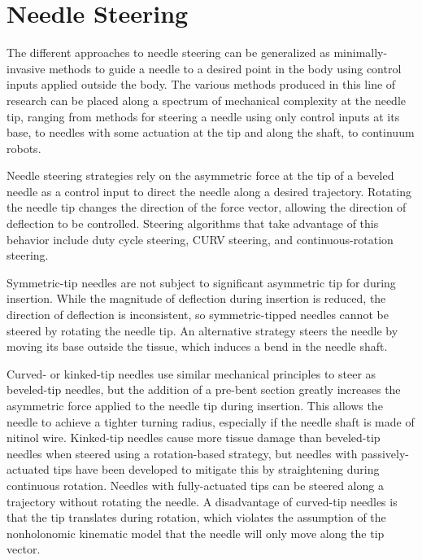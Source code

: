 \section{Needle Steering}

The different approaches to needle steering can be generalized as minimally-invasive methods to guide a needle to a desired point in the body using control inputs applied outside the body. The various methods produced in this line of research can be placed along a spectrum of mechanical complexity at the needle tip, ranging from methods for steering a needle using only control inputs at its base, to needles with some actuation at the tip and along the shaft, to continuum robots. 

Needle steering strategies rely on the asymmetric force at the tip of a beveled needle as a control input to direct the needle along a desired trajectory. Rotating the needle tip changes the direction of the force vector, allowing the direction of deflection to be controlled. Steering algorithms that take advantage of this behavior include duty cycle steering, CURV steering, and continuous-rotation steering.

Symmetric-tip needles are not subject to significant asymmetric tip for during insertion\cite{dimaio_needle_2003}. While the magnitude of deflection during insertion is reduced, the direction of deflection is inconsistent, so symmetric-tipped needles cannot be steered by rotating the needle tip. An alternative strategy steers the needle by moving its base outside the tissue, which induces a bend in the needle shaft\cite{glozman_image-guided_2007}.

Curved- or kinked-tip needles use similar mechanical principles to steer as beveled-tip needles, but the addition of a pre-bent section greatly increases the asymmetric force applied to the needle tip during insertion\cite{reed_integrated_2008}. This allows the needle to achieve a tighter turning radius, especially if the needle shaft is made of nitinol wire. Kinked-tip needles cause more tissue damage than beveled-tip needles when steered using a rotation-based strategy, but needles with passively-actuated tips have been developed to mitigate this by straightening during continuous rotation\cite{swaney_flexure-based_2013}. Needles with fully-actuated tips can be steered along a trajectory without rotating the needle\cite{roesthuis_modeling_2015}. A disadvantage of curved-tip needles is that the tip translates during rotation, which violates the assumption of the nonholonomic kinematic model that the needle will only move along the tip vector\cite{reed_integrated_2008}.

